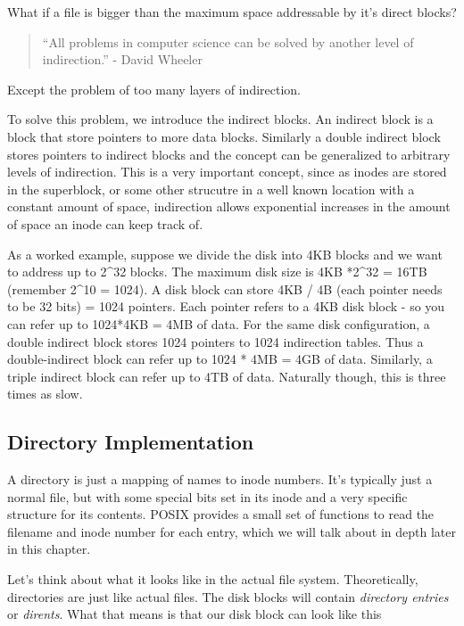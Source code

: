 What if a file is bigger than the maximum space addressable by it's direct blocks?

\begin{quote}
``All problems in computer science can be solved by another level of indirection.'' - David Wheeler
\end{quote}

Except the problem of too many layers of indirection.

To solve this problem, we introduce the indirect blocks. An indirect block is a block that store pointers to more data blocks. Similarly a double indirect block stores pointers to indirect blocks and the concept can be generalized to arbitrary levels of indirection. This is a very important concept, since as inodes are stored in the superblock, or some other strucutre in a well known location with a constant amount of space, indirection allows exponential increases in the amount of space an inode can keep track of.

As a worked example, suppose we divide the disk into 4KB blocks and we want to address up to 2\^{}32 blocks. The maximum disk size is 4KB *2\^{}32 = 16TB (remember 2\^{}10 = 1024). A disk block can store 4KB / 4B (each pointer needs to be 32 bits) = 1024 pointers. Each pointer refers to a 4KB disk block - so you can refer up to 1024*4KB = 4MB of data. For the same disk configuration, a double indirect block stores 1024 pointers to 1024 indirection tables. Thus a double-indirect block can refer up to 1024 * 4MB = 4GB of data. Similarly, a triple indirect block can refer up to 4TB of data. Naturally though, this is three times as slow.

\subsection{Directory Implementation}

A directory is just a mapping of names to inode numbers. It's typically just a normal file, but with some special bits set in its inode and a very specific structure for its contents. POSIX provides a small set of functions to read the filename and inode number for each entry, which we will talk about in depth later in this chapter.

Let's think about what it looks like in the actual file system. Theoretically, directories are just like actual files. The disk blocks will contain \emph{directory entries} or \emph{dirents}. What that means is that our disk block can look like this

